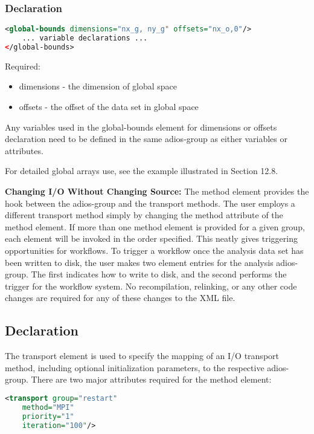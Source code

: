 \subsubsection{Declaration}
\begin{lstlisting}[language=XML]
<global-bounds dimensions="nx_g, ny_g" offsets="nx_o,0"/>
	... variable declarations ... 
</global-bounds>
\end{lstlisting}

Required:
\begin{itemize}
\item dimensions - the dimension of global space
\item offsets - the offset of the data set in global space
\end{itemize}

Any variables used in the global-bounds element for dimensions or offsets declaration 
need to be defined in the same adios-group as either variables or attributes. 

For detailed global arrays use, see the example illustrated in Section 12.8.

\textbf{Changing I/O Without Changing Source:} The method element provides the 
hook between the adios-group and the transport methods. The user employs a different 
transport method simply by changing the method attribute of the method element. 
If more than one method element is provided for a given group, each element will 
be invoked in the order specified. This neatly gives triggering opportunities for 
workflows. To trigger a workflow once the analysis data set has been written to 
disk, the user makes two element entries for the analysis adios-group. The first 
indicates how to write to disk, and the second performs the trigger for the workflow 
system. No recompilation, relinking, or any other code changes are required for 
any of these changes to the XML file.

\subsection{Declaration}

The transport element is used to specify the mapping of an I/O transport method, 
including optional initialization parameters, to the respective adios-group. There 
are two major attributes required for the method element: 
\begin{lstlisting}[language=XML]
<transport group="restart"
	method="MPI"
	priority="1" 
	iteration="100"/>
\end{lstlisting}

